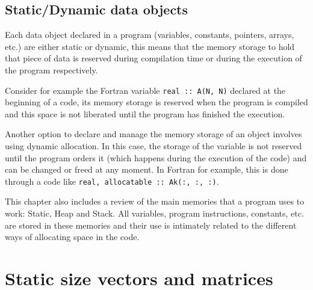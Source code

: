 


    \vspace{-.5cm}
    \subsection*{Static/Dynamic data objects}

Each data object declared in a program (variables, constants, pointers, arrays, etc.) are either static or dynamic, 
this means that the memory storage to hold that piece of data is reserved during compilation time or 
during the execution of the program respectively. 

Consider for example the Fortran variable \texttt{real :: A(N, N)} declared at the beginning of a code, 
its memory storage is reserved when the program is compiled and this space is not liberated 
until the program has finished the execution. 

Another option to declare and manage the memory storage of an object involves using dynamic allocation. 
In this case, the storage of the variable is not reserved until the program orders it (which happens during the execution of the code) and can be changed or freed at any moment. 
In Fortran for example, this is done through a code like \texttt{real, allocatable :: Ak(:, :, :)}.

This chapter also includes a review of the main memories that a program uses to work: Static, Heap and Stack.
All variables, program instructions, constants, etc. are stored in these memories and their use is intimately related 
to the different ways of allocating space in the code.



\newpage 
\section{Static size vectors and matrices} 

